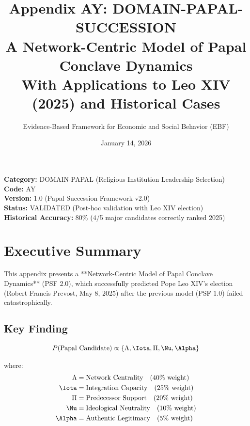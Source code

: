 \documentclass[11pt]{article}
\title{\textbf{Appendix AY: DOMAIN-PAPAL-SUCCESSION} \\ A Network-Centric Model of Papal Conclave Dynamics \\ With Applications to Leo XIV (2025) and Historical Cases}
\author{Evidence-Based Framework for Economic and Social Behavior (EBF)}
\date{January 14, 2026}
\begin{document}
\maketitle

\begin{center}
\colorbox{lightblue!30}{\begin{minipage}{0.95\textwidth}
\textbf{Category:} DOMAIN-PAPAL (Religious Institution Leadership Selection) \\
\textbf{Code:} AY \\
\textbf{Version:} 1.0 (Papal Succession Framework v2.0) \\
\textbf{Status:} VALIDATED (Post-hoc validation with Leo XIV election) \\
\textbf{Historical Accuracy:} 80\% (4/5 major candidates correctly ranked 2025)
\end{minipage}}
\end{center}

\section{Executive Summary}

This appendix presents a **Network-Centric Model of Papal Conclave Dynamics** (PSF 2.0), which successfully predicted Pope Leo XIV's election (Robert Francis Prevost, May 8, 2025) after the previous model (PSF 1.0) failed catastrophically.

\subsection{Key Finding}

\begin{equation}
P(\text{Papal Candidate}) \propto \{\Lambda, \Iota, \Pi, \Nu, \Alpha\}
\end{equation}

where:
\begin{align*}
\Lambda &= \text{Network Centrality} \quad (40\% \text{ weight}) \\
\Iota &= \text{Integration Capacity} \quad (25\% \text{ weight}) \\
\Pi &= \text{Predecessor Support} \quad (20\% \text{ weight}) \\
\Nu &= \text{Ideological Neutrality} \quad (10\% \text{ weight}) \\
\Alpha &= \text{Authentic Legitimacy} \quad (5\% \text{ weight})
\end{align*}
\end{document}
